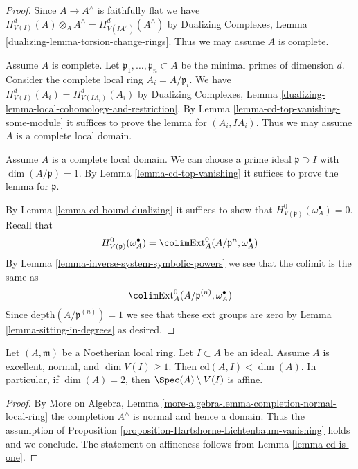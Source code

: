 \begin{proof}
Since $A \to A^\wedge$ is faithfully flat we have
$H^d_{V(I)}(A) \otimes_A A^\wedge = H^d_{V(IA^\wedge)}(A^\wedge)$
by Dualizing Complexes, Lemma \ref{dualizing-lemma-torsion-change-rings}.
Thus we may assume $A$ is complete.

\medskip\noindent
Assume $A$ is complete. Let $\mathfrak p_1, \ldots, \mathfrak p_n \subset A$
be the minimal primes of dimension $d$. Consider the complete local ring
$A_i = A/\mathfrak p_i$. We have $H^d_{V(I)}(A_i) = H^d_{V(IA_i)}(A_i)$
by Dualizing Complexes, Lemma
\ref{dualizing-lemma-local-cohomology-and-restriction}.
By Lemma \ref{lemma-cd-top-vanishing-some-module}
it suffices to prove the lemma for $(A_i, IA_i)$.
Thus we may assume $A$ is a complete local domain.

\medskip\noindent
Assume $A$ is a complete local domain. We can choose a prime ideal
$\mathfrak p \supset I$ with $\dim(A/\mathfrak p) = 1$.
By Lemma \ref{lemma-cd-top-vanishing}
it suffices to prove the lemma for $\mathfrak p$.

\medskip\noindent
By Lemma \ref{lemma-cd-bound-dualizing} it suffices to show that
$H^0_{V(\mathfrak p)}(\omega_A^\bullet) = 0$.
Recall that
$$
H^0_{V(\mathfrak p)}(\omega_A^\bullet) =
\colim \text{Ext}^0_A(A/\mathfrak p^n, \omega_A^\bullet)
$$
By Lemma \ref{lemma-inverse-system-symbolic-powers}
we see that the colimit is the same as
$$
\colim \text{Ext}^0_A(A/\mathfrak p^{(n)}, \omega_A^\bullet)
$$
Since $\text{depth}(A/\mathfrak p^{(n)}) = 1$ we see that
these ext groups are zero by Lemma \ref{lemma-sitting-in-degrees}
as desired.
\end{proof}

\begin{lemma}
\label{lemma-affine-complement}
Let $(A, \mathfrak m)$ be a Noetherian local ring.
Let $I \subset A$ be an ideal. Assume $A$ is excellent,
normal, and $\dim V(I) \geq 1$. Then $\text{cd}(A, I) < \dim(A)$.
In particular, if $\dim(A) = 2$, then $\Spec(A) \setminus V(I)$ is affine.
\end{lemma}

\begin{proof}
By More on Algebra, Lemma
\ref{more-algebra-lemma-completion-normal-local-ring}
the completion $A^\wedge$ is normal and hence a domain.
Thus the assumption of
Proposition \ref{proposition-Hartshorne-Lichtenbaum-vanishing}
holds and we conclude. The statement on affineness
follows from Lemma \ref{lemma-cd-is-one}.
\end{proof}




